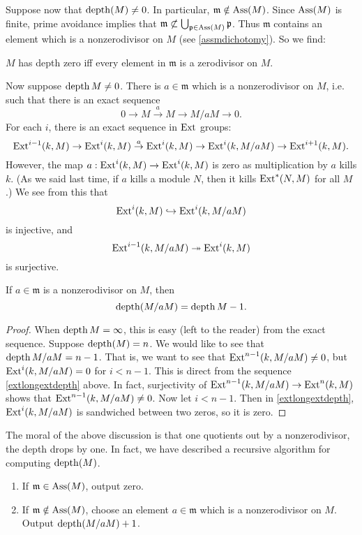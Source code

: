 Suppose now that $\operatorname{depth}(M) \neq 0$. In particular,
$\mathfrak{m} \notin
\operatorname{Ass}(M)$. Since $\operatorname{Ass}(M)$ is finite, prime avoidance implies that
$\mathfrak{m}
\not\subset \bigcup_{\mathfrak{p} \in \operatorname{Ass}(M)} \mathfrak{p}$.
Thus
$\mathfrak{m}$ contains an element which is a nonzerodivisor on
$M$ (see \cref{assmdichotomy}). So we find:

\begin{proposition} \label{depthzero}
$M$ has depth zero iff every element in $\mathfrak{m}$ is a
zerodivisor on $M$.
\end{proposition}

Now suppose $\operatorname{depth} M \neq 0$. There is $a \in \mathfrak{m}$
which is a
nonzerodivisor on $M$, i.e.  such that there is
an exact sequence
\[ 0 \to M \stackrel{a}{\to} M \to M/aM \to 0.  \]
For each $i$, there is an  exact sequence in $\operatorname{Ext}$ groups:
\begin{equation} \label{extlongextdepth}\operatorname{Ext}^{i-1}(k,M) \to \operatorname{Ext}^i(k,M) \stackrel{a}{\to} \operatorname{Ext}^i(k,M)
\to \operatorname{Ext}^i(k,
M/aM) \to \operatorname{Ext}^{i+1}(k,M)  .\end{equation}
However, the map $a: \operatorname{Ext}^i(k,M) \to \operatorname{Ext}^i(k,M)$ is zero as
multiplication by $a$
kills $k$. (As we said last time, if $a$ kills a module $N$,
then it kills
$\operatorname{Ext}^*(N,M)$ for all $M$.) We see from this that
\[ \operatorname{Ext}^i(k,M) \hookrightarrow \operatorname{Ext}^i(k,M/aM)  \]
is injective, and
\[ \operatorname{Ext}^{i-1}(k, M/aM) \twoheadrightarrow \operatorname{Ext}^i(k,M)  \]
is surjective.

\begin{corollary} \label{depthdropsbyone}
If $a \in \mathfrak{m}$ is a nonzerodivisor on $M$, then
\[ \operatorname{depth}(M/aM) = \operatorname{depth} M -1.  \]
\end{corollary}
\begin{proof}
When $\operatorname{depth} M = \infty$, this is easy (left to the reader) from
the exact
sequence. Suppose $\operatorname{depth}(M) = n$. We would like to see that
$\operatorname{depth} M/aM =
n-1$. That is, we want to see that $\operatorname{Ext}^{n-1}(k,M/aM) \neq 0$,
but
$\operatorname{Ext}^i(k,M/aM) =
0$ for $i < n-1$. This is direct from the sequence \eqref{extlongextdepth} above.
In fact, surjectivity of $\operatorname{Ext}^{n-1}(k,M/aM) \to \operatorname{Ext}^n(k,M)$
shows that
$\operatorname{Ext}^{n-1}(k,M/aM) \neq 0$. Now let $i < n-1$. 
Then in \eqref{extlongextdepth}, $\operatorname{Ext}^i(k, M/aM)$ is sandwiched between two
zeros, so it is zero.
\end{proof}

The moral of the above discussion is that one quotients out by a nonzerodivisor, the depth drops by one.
In fact, we have described a recursive algorithm for computing
$\operatorname{depth}(M)$.
\begin{enumerate}
\item If $\mathfrak{m}  \in \operatorname{Ass}(M)$, output zero.
\item If $\mathfrak{m} \notin \operatorname{Ass}(M)$, choose an element $a
\in\mathfrak{m}$
which is a nonzerodivisor on $M$. Output $\operatorname{depth}(M/aM) +1$.
\end{enumerate}


